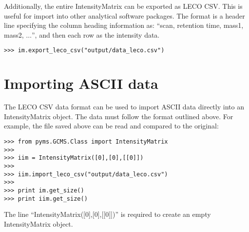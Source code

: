 Additionally, the entire IntensityMatrix can be exported as LECO CSV. This is
 useful for import into other analytical software packages.
The format is a header line specifying the column heading information as:
``scan, retention time, mass1, mass2, $\dots$'', and then each row as the
intensity data.

\begin{verbatim}
>>> im.export_leco_csv("output/data_leco.csv")
\end{verbatim}

\section{Importing ASCII data}


The LECO CSV data format can be used to import ASCII data directly into an
IntensityMatrix object.  The data must follow the format outlined above.  For
example, the file saved above can be read and compared to the original:

\begin{verbatim}
>>> from pyms.GCMS.Class import IntensityMatrix
>>>
>>> iim = IntensityMatrix([0],[0],[[0]])
>>>
>>> iim.import_leco_csv("output/data_leco.csv")
>>>
>>> print im.get_size()
>>> print iim.get_size()
\end{verbatim}

The line ``IntensityMatrix([0],[0],[[0]])'' is required to create an empty
IntensityMatrix object.
